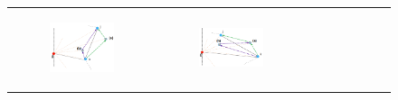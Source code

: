 \documentclass [12pt]{article}
\begin{document}
\begin{enumerate}[label=(\alph*)]
        \begin{figure}[h]
            \centering 
            \begin{tabular}{ccc}
                \begin{subfigure}{0.33\textwidth}
                    \centering
                    \includegraphics[width=1\textwidth]{images/3c2a.PNG}
                    \label{subfig:3c2a}
                \end{subfigure} & 
                \begin{subfigure}{0.33\textwidth}
                    \centering
                    \includegraphics[width=1\textwidth]{images/3c2b.PNG}
                    \label{subfig:3c2b}
                \end{subfigure} & 
                \begin{subfigure}{0.33\textwidth}

\end{subfigure}
\end{tabular}
\end{figure}
\end{enumerate}
\end{document}
